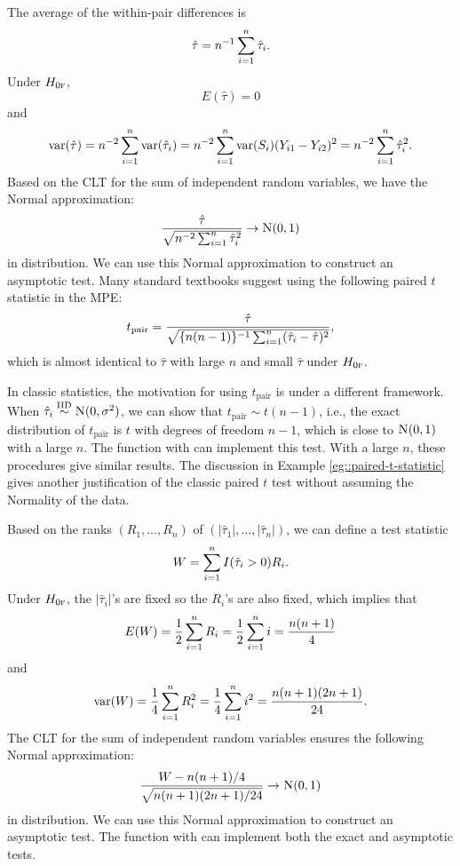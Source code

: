 \begin{example} 
\label{eg::paired-t-statistic}
The average of the within-pair differences is
$$
\hat{\tau} = n^{-1}  \sum_{i=1}^n \hat{\tau}_i .
$$
Under $H_{0\textsc{f}}$, 
$$
E(\hat{\tau} ) = 0
$$
and
$$
\textup{var}(  \hat{\tau}   ) 
= n^{-2} \sum_{i=1}^n \textup{var}(  \hat{\tau}_i ) 
= n^{-2} \sum_{i=1}^n \textup{var}(S_i) (Y_{i1}  - Y_{i2})^2 =  n^{-2} \sum_{i=1}^n  \hat{\tau}_i^2 . 
$$
Based on the CLT for the sum of independent random variables, we have the  Normal approximation:
$$
\frac{  \hat{\tau}  }{ \sqrt{  n^{-2} \sumn  \hat{\tau}_i^2 } } \rightarrow \N01 
$$
in distribution.  We can use this Normal approximation to construct an asymptotic test. Many standard textbooks suggest using the following paired $t$ statistic in the MPE:
$$
t_\text{pair} = \frac{  \hat{\tau}  }{ \sqrt{  \{ n(n-1) \}^{-1} \sum_{i=1}^n  (\hat{\tau}_i - \hat{\tau} ) ^2 } },
$$
which is almost identical to $\hat{\tau}$ with large $n$ and small $\hat{\tau} $ under $H_{0\textsc{f}}$. 
\end{example} 

In classic statistics, the motivation for using $t_\text{pair}$ is under a different framework. When $\hat{\tau}_i \stackrel{\textup{IID}}{\sim} \textsc{N}(0, \sigma^2)$, we can show that $t_\text{pair} \sim t(n-1)$, i.e., the exact distribution of $t_\text{pair} $ is $t$ with degrees of freedom $n-1$, which is close to $\N01$ with a large $n$. The  function  with  can implement this test. With a large $n$, these procedures give similar results. The discussion in Example  \ref{eg::paired-t-statistic} gives another justification of the classic paired $t$ test without assuming the Normality of the data. 

 
 
 

 
 
  \begin{example}
 \label{eg::mpe-sign-rank}
Based on the ranks $(R_1, \ldots, R_n)$ of $( | \hat{\tau}_1| , \ldots, | \hat{\tau}_n| )$, we can define a test statistic
$$
W = \sum_{i=1}^n  I( \hat{\tau}_i > 0 ) R_i. 
$$
Under $H_{0\textsc{f}}$, the $| \hat{\tau}_i|$'s are fixed so the $R_i$'s are also fixed, which implies that 
$$
E(W) = \frac{1}{2} \sum_{i=1}^n R_i = \frac{1}{2} \sum_{i=1}^n i = \frac{n(n+1)}{4}
$$
and
$$
\textup{var}(W) = \frac{1}{4} \sum_{i=1}^n R_i^2 = \frac{1}{4} \sum_{i=1}^n i^2 = \frac{n(n+1)(2n+1)}{24}. 
$$
The CLT for the sum of independent random variables ensures the following Normal approximation: 
$$
\frac{W - n(n+1)/4}{ \sqrt{n(n+1)(2n+1) / 24    } } \rightarrow \N01
$$
in distribution. 
We can use this Normal approximation to construct an asymptotic test.  The  function  with  can implement both the exact and asymptotic tests. 
 \end{example}
 
